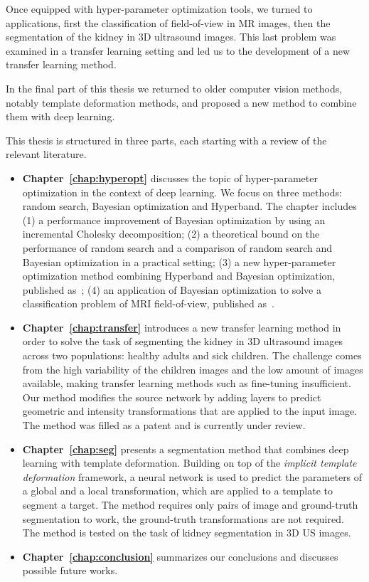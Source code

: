 Once equipped with hyper-parameter optimization tools, we turned to applications, first the classification of field-of-view in MR images, then the segmentation of the kidney in 3D ultrasound images. This last problem was examined in a transfer learning setting and led us to the development of a new transfer learning method. 

In the final part of this thesis we returned to older computer vision methods, notably template deformation methods, and proposed a new method to combine them with deep learning.

This thesis is structured in three parts, each starting with a review of the relevant literature. 

\begin{itemize}
    \item \textbf{Chapter~\ref{chap:hyperopt}} discusses the topic of hyper-parameter optimization in the context of deep learning. We focus on three methods: random search, Bayesian optimization and Hyperband. The chapter includes (1) a performance improvement of Bayesian optimization by using an incremental Cholesky decomposition; (2) a theoretical bound on the performance of random search and a comparison of random search and Bayesian optimization in a practical setting; (3) a new hyper-parameter optimization method combining Hyperband and Bayesian optimization, published as~\textcite{bertrand2017CAp}; (4) an application of Bayesian optimization to solve a classification problem of MRI field-of-view, published as~\textcite{bertrand2017ISBI}.
    \item \textbf{Chapter~\ref{chap:transfer}} introduces a new transfer learning method in order to solve the task of segmenting the kidney in 3D ultrasound images across two populations: healthy adults and sick children. The challenge comes from the high variability of the children images and the low amount of images available, making transfer learning methods such as fine-tuning insufficient. Our method modifies the source network by adding layers to predict geometric and intensity transformations that are applied to the input image. The method was filled as a patent and is currently under review.
    \item \textbf{Chapter~\ref{chap:seg}} presents a segmentation method that combines deep learning with template deformation. Building on top of the \textit{implicit template deformation} framework, a neural network is used to predict the parameters of a global and a local transformation, which are applied to a template to segment a target. The method requires only pairs of image and ground-truth segmentation to work, the ground-truth transformations are not required. The method is tested on the task of kidney segmentation in 3D US images.
    \item \textbf{Chapter~\ref{chap:conclusion}} summarizes our conclusions and discusses possible future works.
\end{itemize}
